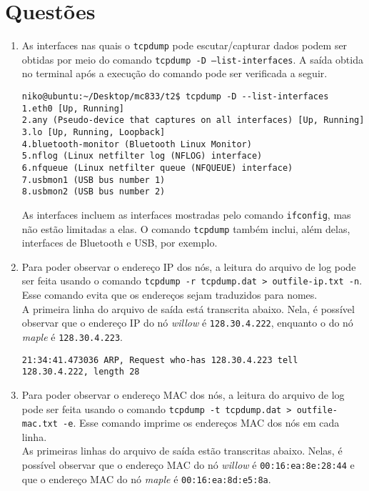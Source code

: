 \documentclass[a4paper,10pt]{article}
\begin{document}
\section{Questões}
\begin{enumerate}
\item As interfaces nas quais o {\tt tcpdump} pode escutar/capturar dados podem ser obtidas por meio do comando {\tt tcpdump -D --list-interfaces}. A saída obtida no terminal após a execução do comando pode ser verificada a seguir.

\begin{lstlisting}
niko@ubuntu:~/Desktop/mc833/t2$ tcpdump -D --list-interfaces
1.eth0 [Up, Running]
2.any (Pseudo-device that captures on all interfaces) [Up, Running]
3.lo [Up, Running, Loopback]
4.bluetooth-monitor (Bluetooth Linux Monitor)
5.nflog (Linux netfilter log (NFLOG) interface)
6.nfqueue (Linux netfilter queue (NFQUEUE) interface)
7.usbmon1 (USB bus number 1)
8.usbmon2 (USB bus number 2)
\end{lstlisting}

As interfaces incluem as interfaces mostradas pelo comando {\tt ifconfig}, mas não estão limitadas a elas. O comando {\tt tcpdump} também inclui, além delas, interfaces de Bluetooth e USB, por exemplo.


\item Para poder observar o endereço IP dos nós, a leitura do arquivo de log pode ser feita usando o comando {\tt tcpdump -r tcpdump.dat > outfile-ip.txt -n}. Esse comando evita que os endereços sejam traduzidos para nomes.\\

A primeira linha do arquivo de saída está transcrita abaixo. Nela, é possível observar que o endereço IP do nó \textit{willow} é {\tt 128.30.4.222}, enquanto o do nó \textit{maple} é {\tt 128.30.4.223}. 

\begin{lstlisting}
21:34:41.473036 ARP, Request who-has 128.30.4.223 tell 128.30.4.222, length 28
\end{lstlisting}


\item Para poder observar o endereço MAC dos nós, a leitura do arquivo de log pode ser feita usando o comando {\tt tcpdump -t tcpdump.dat > outfile-mac.txt -e}. Esse comando imprime os endereços MAC dos nós em cada linha.\\

As primeiras linhas do arquivo de saída estão transcritas abaixo. Nelas, é possível observar que o endereço MAC do nó \textit{willow} é {\tt 00:16:ea:8e:28:44} e que o endereço MAC do nó \textit{maple} é {\tt 00:16:ea:8d:e5:8a}.


\end{enumerate}
\end{document}
